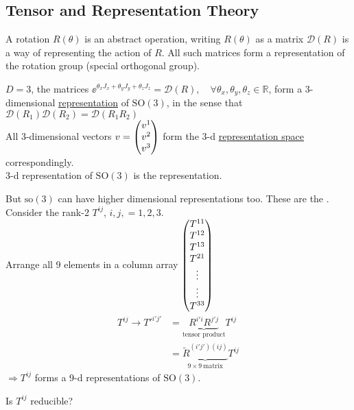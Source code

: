 \documentclass[11pt,fleqn]{book} %
\begin{document}
\subsection{Tensor and Representation Theory}
A rotation \(R(\theta)\) is an abstract operation, writing \(R(\theta)\) as a
matrix \(\mathcal{D}(R)\) is a way of representing the action of \(R\). All such matrices
form a representation of the rotation group (special orthogonal group).
\begin{example}
  \(D = 3\), the matrices \(\ee^{\theta_x J_x + \theta_y J_y + \theta_z
    J_z} = \mathcal{D}(R), \quad \forall \theta_x, \theta_y, \theta_z \in
  \mathbb{R}\), form a 3-dimensional \uline{representation} of
  \(\textrm{SO}(3)\), in the sense that \(\mathcal{D}(R_1) \mathcal{D}(R_2) =
  \mathcal{D}(R_1 R_2)\) \\
  All 3-dimensional vectors \(v = \mqty(v^1 \\ v^2 \\
  v^3)\) form the 3-d \uline{representation space} correspondingly. \\
  3-d representation of \(\textrm{SO}(3)\) is the  representation.
\end{example}
But \(\mathrm{so}(3)\) can have higher dimensional representations too.
These are the .\\
Consider the rank-2 \(T^{ij}\), \(i,j,=1,2,3\). \\
Arrange all 9 elements in a column array \(\mqty(T^{11} \\ T^{12} \\ T^{13} \\
T^{21} \\ \vdots \\ \vdots \\ T^{33})\)
\begin{align*}
  T^{ij} \to T'^{i'j'} &= \underbrace{R^{i'i} R^{j'j}}_{\text{tensor product}} T^{ij} \\
  &= \underbrace{\tilde{R}^{(i'j')(ij)}}_{9 \times 9\ \text{matrix}} T^{ij}
\end{align*}
\(\Rightarrow T^{ij}\) forms a 9-d representations of \(\mathrm{SO}(3)\).
\begin{problem}
  Is \(T^{ij}\) reducible?
\end{problem}
\end{document}
